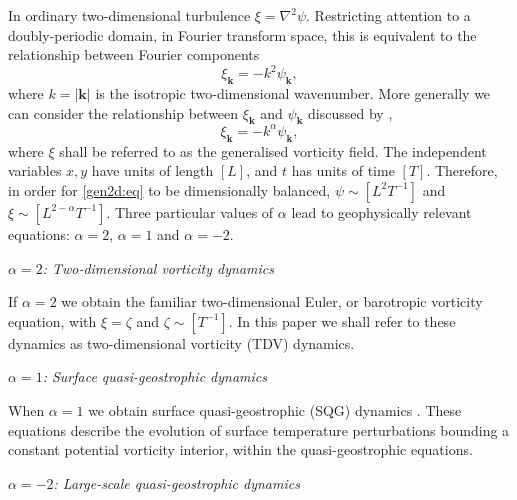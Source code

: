 \documentclass{jfm}
\newcommand{\eg}  {\textit{e.g., }}
\newcommand{\kb}  {\boldsymbol{k}}
\newcommand{\del} {\nabla}
\begin{document}
In ordinary two-dimensional turbulence $\xi = \del^2 \psi$.
Restricting attention to a doubly-periodic domain, in Fourier
transform space, this is equivalent to the relationship between
Fourier components
\begin{equation}
\xi_{\kb} = -k^2\psi_{\kb},
\label{coupling1:eq}
\end{equation}
where $k=|\kb|$ is the isotropic two-dimensional wavenumber. More
generally we can consider the relationship between $\xi_{\kb}$ and
$\psi_{\kb}$ discussed by \citet{Pierrehumbert94},
\begin{equation}
\xi_{\kb} = -k^{\alpha}\psi_{\kb},
\label{coupling:eq}
\end{equation}
where $\xi$ shall be referred to as the generalised vorticity
field. The independent variables $x,y$ have units of length $[L]$, and
$t$ has units of time $[T]$.  Therefore, in order for \eqref{gen2d:eq}
to be dimensionally balanced, $\psi \sim [L^2T^{-1}]$ and $\xi \sim
[L^{2-\alpha}T^{-1}]$.  Three particular values of $\alpha$ lead to
geophysically relevant equations: $\alpha=2$, $\alpha = 1$ and $\alpha
= -2$.

\bigskip
\noindent\textit{$\alpha = 2$: Two-dimensional vorticity dynamics}

\begin{narrower}

\noindent If $\alpha=2$ we obtain the familiar two-dimensional Euler, or
ba\-ro\-tro\-pic vor\-ticity equation, with $\xi = \zeta$ and $\zeta \sim
[T^{-1}]$. In this paper we shall refer to these dynamics as
two-dimensional vorticity (TDV) dynamics.

\end{narrower}

\bigskip
\noindent\textit{$\alpha = 1$: Surface quasi-geostrophic dynamics}

\begin{narrower}

\noindent When $\alpha=1$ we obtain surface quasi-geostrophic (SQG)
dynamics \citep[\eg][and references therein]{Held95a}. These equations
describe the evolution of surface temperature perturbations bounding a
constant potential vorticity interior, within the quasi-geostrophic
equations.

\end{narrower}

\bigskip
\noindent\textit{$\alpha = -2$: Large-scale quasi-geostrophic dynamics}
\end{document}
